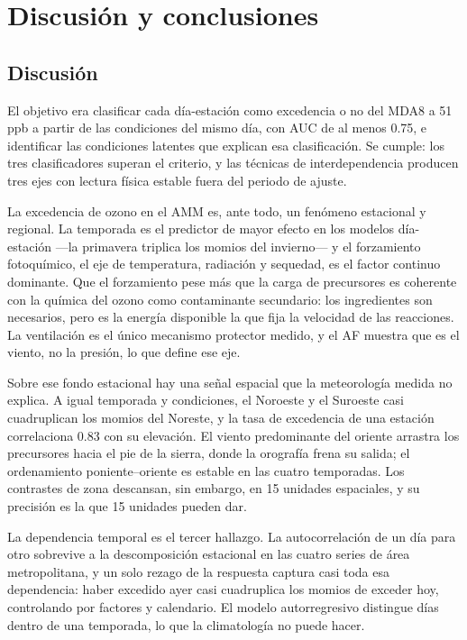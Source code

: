 \section{Discusión y conclusiones}
\label{sec:conclusiones}

\subsection{Discusión}

El objetivo era clasificar cada día-estación como excedencia o no del MDA8
a 51 ppb a partir de las condiciones del mismo día, con AUC de al menos
0.75, e identificar las condiciones latentes que explican esa
clasificación. Se cumple: los tres clasificadores superan el criterio, y las
técnicas de interdependencia producen tres ejes con lectura física estable
fuera del periodo de ajuste.

La excedencia de ozono en el AMM es, ante todo, un fenómeno estacional y
regional. La temporada es el predictor de mayor efecto en los modelos
día-estación ---la primavera triplica los momios del invierno--- y el
forzamiento fotoquímico, el eje de temperatura, radiación y sequedad, es el
factor continuo dominante. Que el forzamiento pese más que la carga de
precursores es coherente con la química del ozono como contaminante
secundario: los ingredientes son necesarios, pero es la energía disponible
la que fija la velocidad de las reacciones. La ventilación es el único
mecanismo protector medido, y el AF muestra que es el viento, no la presión,
lo que define ese eje.

Sobre ese fondo estacional hay una señal espacial que la meteorología medida
no explica. A igual temporada y condiciones, el Noroeste y el Suroeste casi
cuadruplican los momios del Noreste, y la tasa de excedencia de una estación
correlaciona 0.83 con su elevación. El viento predominante del oriente
arrastra los precursores hacia el pie de la sierra, donde la orografía frena
su salida; el ordenamiento poniente--oriente es estable en las cuatro
temporadas. Los contrastes de zona descansan, sin embargo, en 15 unidades
espaciales, y su precisión es la que 15 unidades pueden dar.

La dependencia temporal es el tercer hallazgo. La autocorrelación de un día
para otro sobrevive a la descomposición estacional en las cuatro series de
área metropolitana, y un solo rezago de la respuesta captura casi toda esa
dependencia: haber excedido ayer casi cuadruplica los momios de exceder hoy,
controlando por factores y calendario. El modelo autorregresivo distingue
días dentro de una temporada, lo que la climatología no puede hacer.

